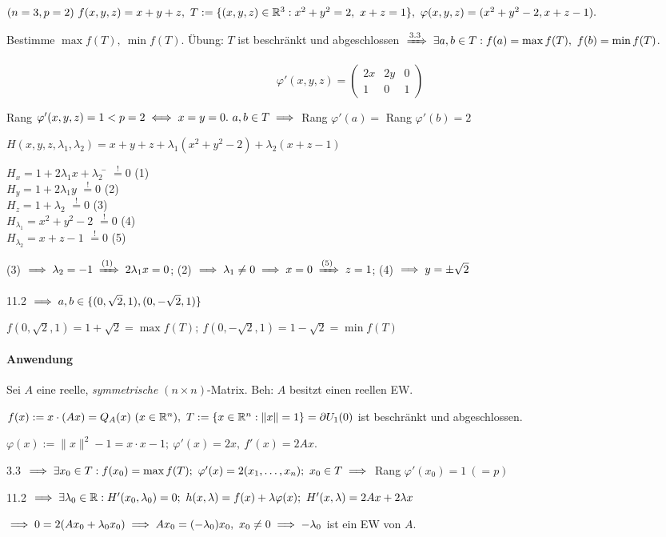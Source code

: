 \documentclass[a4paper,oneside,DIV15,BCOR12mm,chapterprefix=true,headings=onelinechapter]{scrbook}
\begin{document}
\begin{beispiel}
$(n=3,p=2)\ f(x,y,z) = x+y+z,\ T:=\{(x,y,z) \in \mathbb{R}^3: x^2+y^2=2,\ x+z=1\},\ \varphi(x,y,z) = (x^2+y^2-2,x+z-1).$

Bestimme $\max f(T),\ \min f(T)$. Übung: $T$ ist beschränkt und abgeschlossen $\folgtnach{3.3} \exists a,b \in T: f(a) = \max f(T),\ f(b) = \min f(T)$.

$$\varphi'(x,y,z) = \left(\begin{array}{ccc}
2x & 2y & 0\\
1  & 0  & 1
\end{array}\right)$$

Rang $\varphi'(x,y,z) = 1 < p=2 \iff x=y=0.\ a,b\in T \implies$ Rang $\varphi'(a) =$ Rang $\varphi'(b) = 2$

\def\shouldbe{\overset{!}{=}}

$H(x,y,z,\lambda_1,\lambda_2) = x+y+z+\lambda_1(x^2+y^2-2) + \lambda_2(x+z-1)$\\
\begin{tabbing}
$H_x=1+2\lambda_1x+\lambda_2$ \= $\shouldbe 0$ (1)\\
$H_y=1+2\lambda_1y          $ \> $\shouldbe 0$ (2)\\
$H_z=1+\lambda_2            $ \> $\shouldbe 0$ (3)\\
$H_{\lambda_1}=x^2+y^2-2    $ \> $\shouldbe 0$ (4)\\
$H_{\lambda_2}=x+z-1        $ \> $\shouldbe 0$ (5)
\end{tabbing}

(3) $\folgt \lambda_2=-1 \folgtnach{(1)} 2\lambda_1x=0$; (2) $\folgt \lambda_1\ne0 \folgt x=0 \folgtnach{(5)} z=1$; (4) $\implies y = \pm \sqrt{2}$

11.2 $\implies a,b \in \{(0,\sqrt{2},1),(0,-\sqrt{2},1)\}$

$f(0,\sqrt{2},1) = 1+\sqrt{2} = \max f(T);\ f(0,-\sqrt{2},1) = 1-\sqrt{2} = \min f(T)$

\end{beispiel}

\paragraph{Anwendung}
Sei $A$ eine reelle, \emph{symmetrische} $(n\times n)$-Matrix. Beh: $A$ besitzt einen reellen EW.

\begin{beweis}
$f(x) := x\cdot(Ax) = Q_A(x)\ (x \in \mathbb{R}^n),\ T:= \{x \in \mathbb{R}^n: \|x\|=1\} = \partial U_1(0)$ ist beschränkt und abgeschlossen.

$\varphi(x) := \|x\|^2-1 = x\cdot x-1;\ \varphi'(x) = 2x,\ f'(x) = 2Ax$.

3.3 $\implies \exists x_0 \in T: f(x_0) = \max f(T);\ \varphi'(x) = 2(x_1,\ldots,x_n);\ x_0 \in T \implies$ Rang $\varphi'(x_0) = 1\ (=p)$

11.2 $\folgt \exists \lambda_0 \in \MdR: H'(x_0,\lambda_0) = 0;\ h(x,\lambda) = f(x)+\lambda\varphi(x);\ H'(x,\lambda) = 2Ax+2\lambda x$

$\implies 0 = 2(Ax_0+\lambda_0 x_0) \implies Ax_0 = (-\lambda_0) x_0,\ x_0 \ne 0 \implies -\lambda_0$ ist ein EW von $A$.
\end{beweis}
\end{document}
